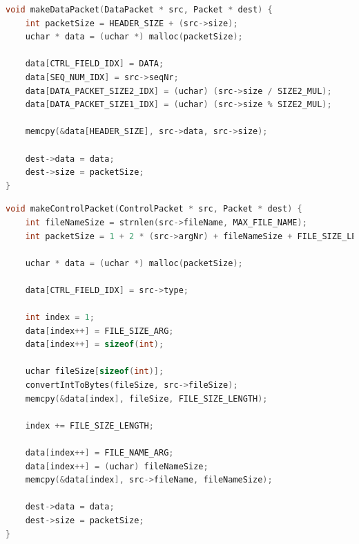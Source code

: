\documentclass[a4paper, 11pt]{article}
\begin{document}
\begin{lstlisting}[caption = makeDataPacket, language=C]
void makeDataPacket(DataPacket * src, Packet * dest) {
	int packetSize = HEADER_SIZE + (src->size);
	uchar * data = (uchar *) malloc(packetSize);

	data[CTRL_FIELD_IDX] = DATA;
	data[SEQ_NUM_IDX] = src->seqNr;
	data[DATA_PACKET_SIZE2_IDX] = (uchar) (src->size / SIZE2_MUL);
	data[DATA_PACKET_SIZE1_IDX] = (uchar) (src->size % SIZE2_MUL);

	memcpy(&data[HEADER_SIZE], src->data, src->size);

	dest->data = data;
	dest->size = packetSize;
}
\end{lstlisting}

\begin{lstlisting}[caption = makeControlPacket, language=C]
void makeControlPacket(ControlPacket * src, Packet * dest) {
	int fileNameSize = strnlen(src->fileName, MAX_FILE_NAME);
	int packetSize = 1 + 2 * (src->argNr) + fileNameSize + FILE_SIZE_LENGTH;

	uchar * data = (uchar *) malloc(packetSize);

	data[CTRL_FIELD_IDX] = src->type;

	int index = 1;
	data[index++] = FILE_SIZE_ARG;
	data[index++] = sizeof(int);

	uchar fileSize[sizeof(int)];
	convertIntToBytes(fileSize, src->fileSize);
	memcpy(&data[index], fileSize, FILE_SIZE_LENGTH);

	index += FILE_SIZE_LENGTH;

	data[index++] = FILE_NAME_ARG;
	data[index++] = (uchar) fileNameSize;
	memcpy(&data[index], src->fileName, fileNameSize);

	dest->data = data;
	dest->size = packetSize;
}
\end{lstlisting}
\end{document}
